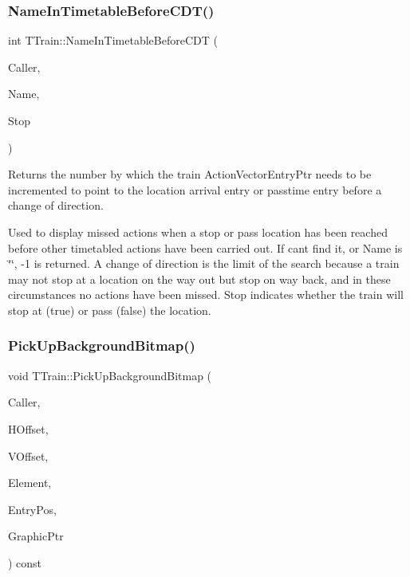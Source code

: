 \subsubsection{\texorpdfstring{Name\+In\+Timetable\+Before\+C\+D\+T()}{NameInTimetableBeforeCDT()}}
{\footnotesize\ttfamily int T\+Train\+::\+Name\+In\+Timetable\+Before\+C\+DT (\begin{DoxyParamCaption}\item[{int}]{Caller,  }\item[{Ansi\+String}]{Name,  }\item[{bool \&}]{Stop }\end{DoxyParamCaption})\hspace{0.3cm}{\ttfamily [private]}}

Returns the number by which the train Action\+Vector\+Entry\+Ptr needs to be incremented to point to the location arrival entry or passtime entry before a change of direction.

Used to display missed actions when a stop or pass location has been reached before other timetabled actions have been carried out. If can\textquotesingle{}t find it, or Name is \char`\"{}\char`\"{}, -\/1 is returned. A change of direction is the limit of the search because a train may not stop at a location on the way out but stop on way back, and in these circumstances no actions have been missed. Stop indicates whether the train will stop at (true) or pass (false) the location. \mbox{\label{class_t_train_af92ae73f1be23475e7ae424306cd4866}} 
\subsubsection{\texorpdfstring{Pick\+Up\+Background\+Bitmap()}{PickUpBackgroundBitmap()}}
{\footnotesize\ttfamily void T\+Train\+::\+Pick\+Up\+Background\+Bitmap (\begin{DoxyParamCaption}\item[{int}]{Caller,  }\item[{int}]{H\+Offset,  }\item[{int}]{V\+Offset,  }\item[{int}]{Element,  }\item[{int}]{Entry\+Pos,  }\item[{Graphics\+::\+T\+Bitmap $\ast$}]{Graphic\+Ptr }\end{DoxyParamCaption}) const\hspace{0.3cm}{\ttfamily [private]}}


